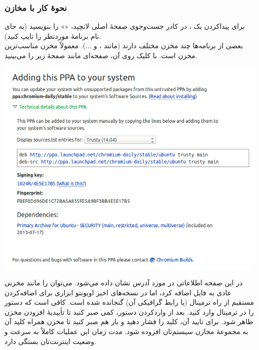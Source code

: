 \subsubsection[نحوهٔ کار با مخازن ppa]{نحوهٔ کار با مخازن }
برای پیداکردن یک ، در کادر جست‌وجوی صفحهٔ اصلی لانچپد، «» را بنویسید (به جای  نام برنامهٔ موردنظر را تایپ کنید).\\
بعضی از برنامه‌ها چند مخزن مختلف دارند (مانند ،  و ...). معمولاً مخزن  مناسب‌ترین مخزن است. با کلیک روی آن، صفحه‌ای مانند صفحهٔ زیر را می‌بینید.\\
\begin{center}
\includegraphics[scale=0.5]{pics/37.png}
\end{center}

در این صفحه اطلاعاتی در مورد آدرس  نشان داده می‌شود. می‌توان  را مانند مخزنی عادی به فایل  اضافه کرد، اما در نسخه‌های اخیر اوبونتو ابزاری برای اضافه‌کردن مستقیم  از راه ترمینال (یا رابط گرافیکی آن) گنجانده شده است. کافی است که دستور  را در ترمینال وارد کنید. بعد از واردکردن دستور، کمی صبر کنید تا تأییدیهٔ افزودن مخزن ظاهر شود. برای تایید آن، کلید  را فشار دهید و باز هم صبر کنید تا مخزن همراه کلید آن به مجموعهٔ مخازن سیستم‌تان افزوده شود. مدت زمان این عملیات کاملاً به سرعت و وضعیت اینترنت‌تان بستگی دارد.

